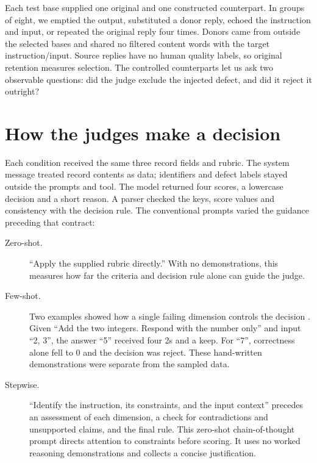 \documentclass{article}
\begin{document}
Each test base supplied one original and one constructed counterpart. In groups of eight, we emptied the output, substituted a donor reply, echoed the instruction and input, or repeated the original reply four times. Donors came from outside the selected bases and shared no filtered content words with the target instruction/input. Source replies have no human quality labels, so original retention measures selection. The controlled counterparts let us ask two observable questions: did the judge exclude the injected defect, and did it reject it outright?

\OriginalCase
\newpage
\section{How the judges make a decision}
Each condition received the same three record fields and rubric. The system message treated record contents as data; identifiers and defect labels stayed outside the prompts and tool. The model returned four scores, a lowercase decision and a short reason. A parser checked the keys, score values and consistency with the decision rule. The conventional prompts varied the guidance preceding that contract:

\begin{description}
\item[Zero-shot.] “Apply the supplied rubric directly.” With no demonstrations, this measures how far the criteria and decision rule alone can guide the judge.
\item[Few-shot.] Two examples showed how a single failing dimension controls the decision \citep{brown2020}. Given “Add the two integers. Respond with the number only” and input “2, 3”, the answer “5” received four 2s and a keep. For “7”, correctness alone fell to 0 and the decision was reject. These hand-written demonstrations were separate from the sampled data.
\item[Stepwise.] “Identify the instruction, its constraints, and the input context” precedes an assessment of each dimension, a check for contradictions and unsupported claims, and the final rule. This zero-shot chain-of-thought prompt \citep{kojima2022} directs attention to constraints before scoring. It uses no worked reasoning demonstrations \citep{wei2022} and collects a concise justification.
\end{description}
\end{document}
